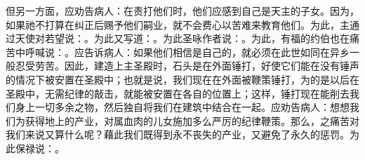 但另一方面，应劝告病人：在责打他们时，他们应感到自己是天主的子女。因为，如果祂不打算在纠正后赐予他们嗣业，就不会费心以苦难来教育他们。为此，主通过天使对若望说：。为此又写道：。为此圣咏作者说：。为此，有福的约伯也在痛苦中呼喊说：。应告诉病人：如果他们相信是自己的，就必须在此世如同在异乡一般忍受劳苦。因此，建造上主圣殿时，石头是在外面锤打，好使它们能在没有锤声的情况下被安置在圣殿中；也就是说，我们现在在外面被鞭策锤打，为的是以后在圣殿中，无需纪律的敲击，就能被安置在各自的位置上；这样，锤打现在能削去我们身上一切多余之物，然后独自将我们在建筑中结合在一起。应劝告病人：想想我们为获得地上的产业，对属血肉的儿女施加多么严厉的纪律鞭策。那么，之痛苦对我们来说又算什么呢？藉此我们既得到永不丧失的产业，又避免了永久的惩罚。为此保禄说：。\par

